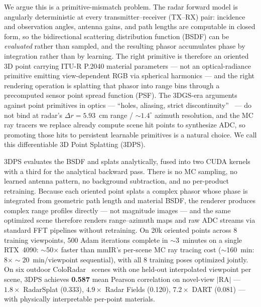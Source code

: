 We argue this is a primitive-mismatch problem. The radar forward model is angularly deterministic at every transmitter--receiver (TX--RX) pair: incidence and observation angles, antenna gains, and path lengths are computable in closed form, so the bidirectional scattering distribution function (BSDF) can be \emph{evaluated} rather than sampled, and the resulting phasor accumulates phase by integration rather than by learning. The right primitive is therefore an oriented 3D point carrying ITU-R P.2040 material parameters --- not an optical-radiance primitive emitting view-dependent RGB via spherical harmonics --- and the right rendering operation is splatting that phasor into range bins through a precomputed sensor point spread function (PSF). The 3DGS-era arguments against point primitives in optics --- ``holes, aliasing, strict discontinuity''~\cite{3dgs} --- do not bind at radar's $\Delta r{=}5.93$~cm range / ${\sim}1.4^\circ$ azimuth resolution, and the MC ray tracers we replace already compute scene hit points to synthesize ADC, so promoting those hits to persistent learnable primitives is a natural choice. We call this differentiable 3D Point Splatting (3DPS).

3DPS evaluates the BSDF and splats analytically, fused into two CUDA kernels with a third for the analytical backward pass. There is no MC sampling, no learned antenna pattern, no background subtraction, and no per-product retraining. Because each oriented point splats a complex phasor whose phase is integrated from geometric path length and material BSDF, the renderer produces complex range profiles directly --- not magnitude images --- and the same optimized scene therefore renders range--azimuth maps and raw ADC streams via standard FFT pipelines without retraining. On 20k oriented points across 8 training viewpoints, 500 Adam iterations complete in ${\sim}$3~minutes on a single RTX~4090: ${\sim}$50$\times$ faster than mmIR's per-scene MC ray tracing cost (${\sim}$160~min: $8\times{\sim}20$~min/viewpoint sequential), with all 8 training poses optimized jointly. On six outdoor ColoRadar~\cite{kramer2022coloradar} scenes with one held-out interpolated viewpoint per scene, 3DPS achieves \textbf{0.587} mean Pearson correlation on novel-view $|\mathrm{RA}|$ --- $1.8\times$ RadarSplat (0.333), $4.9\times$ Radar Fields (0.120), $7.2\times$ DART (0.081) --- with physically interpretable per-point materials.

